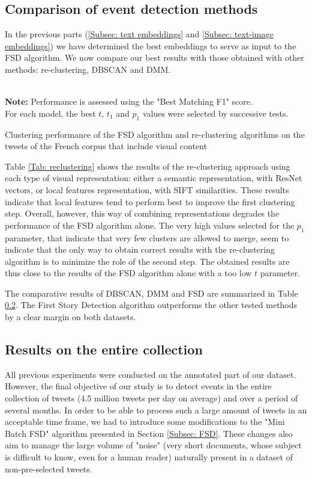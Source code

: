 \subsection{Comparison of event detection methods}

In the previous parts (\ref{Subsec: text embeddings} and \ref{Subsec: text-image embeddings})  we have determined the best embeddings to serve as input to the FSD algorithm. We now compare our best results with those obtained with other methods: re-clustering, DBSCAN and DMM.

\begin{table}[ht]
\begin{center}

\\

{\scriptsize \textbf{Note:} Performance is assessed using the "Best Matching F1" score.\\ 
For each model, the best $t$, $t_1$ and $p_1$ values were selected by successive tests.}
\caption{Clustering performance of the FSD algorithm and re-clustering algorithms on the tweets of the French corpus that include visual content} \label{Tab: reclustering}
\end{center}
\end{table}
Table \ref{Tab: reclustering} shows the results of the re-clustering approach using each type of visual representation: either a semantic representation, with ResNet vectors, or local features representation, with SIFT similarities. These results indicate that local features tend to perform best to improve the first clustering step. Overall, however, this way of combining representations degrades the performance of the FSD algorithm alone. The very high values selected for the $p_1$ parameter, that indicate that very few clusters are allowed to merge, seem to indicate that the only way to obtain correct results with the re-clustering algorithm is to minimize the role of the second step. The obtained results are thus close to the results of the FSD algorithm alone with a too low $t$ parameter.

The comparative results of DBSCAN, DMM and FSD are summarized in Table \ref{}. The First Story Detection algorithm outperforms the other tested methods by a clear margin on both datasets.

\subsection{Results on the entire collection}
All previous experiments were conducted on the annotated part of our dataset. However, the final objective of our study is to detect events in the entire collection of tweets (4.5 million tweets per day on average) and over a period of several months. In order to be able to process such a large amount of tweets in an acceptable time frame, we had to introduce some modifications to the "Mini Batch FSD" algorithm presented in Section \ref{Subsec: FSD}. These changes also aim to manage the large volume of "noise" (very short documents, whose subject is difficult to know, even for a human reader) naturally present in a dataset of non-pre-selected tweets.

